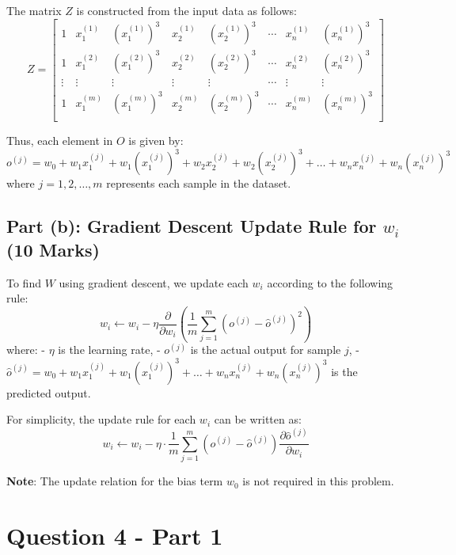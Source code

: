 \documentclass{article}
\begin{document}
	The matrix \( Z \) is constructed from the input data as follows:
	\[
	Z = \begin{bmatrix}
		1 & x_{1}^{(1)} & \left( x_{1}^{(1)} \right)^3 & x_{2}^{(1)} & \left( x_{2}^{(1)} \right)^3 & \cdots & x_{n}^{(1)} & \left( x_{n}^{(1)} \right)^3 \\
		1 & x_{1}^{(2)} & \left( x_{1}^{(2)} \right)^3 & x_{2}^{(2)} & \left( x_{2}^{(2)} \right)^3 & \cdots & x_{n}^{(2)} & \left( x_{n}^{(2)} \right)^3 \\
		\vdots & \vdots & \vdots & \vdots & \vdots & \cdots & \vdots & \vdots \\
		1 & x_{1}^{(m)} & \left( x_{1}^{(m)} \right)^3 & x_{2}^{(m)} & \left( x_{2}^{(m)} \right)^3 & \cdots & x_{n}^{(m)} & \left( x_{n}^{(m)} \right)^3 \\
	\end{bmatrix}
	\]
	
	Thus, each element in \( O \) is given by:
	\[
	o^{(j)} = w_0 + w_1 x_1^{(j)} + w_1 \left( x_1^{(j)} \right)^3 + w_2 x_2^{(j)} + w_2 \left( x_2^{(j)} \right)^3 + \dots + w_n x_n^{(j)} + w_n \left( x_n^{(j)} \right)^3
	\]
	where \( j = 1, 2, \dots, m \) represents each sample in the dataset.
	
	\subsection*{Part (b): Gradient Descent Update Rule for \( w_i \) (10 Marks)}
	
	To find \( W \) using gradient descent, we update each \( w_i \) according to the following rule:
	\[
	w_i \leftarrow w_i - \eta \frac{\partial}{\partial w_i} \left( \frac{1}{m} \sum_{j=1}^{m} \left( o^{(j)} - \hat{o}^{(j)} \right)^2 \right)
	\]
	where:
	- \( \eta \) is the learning rate,
	- \( o^{(j)} \) is the actual output for sample \( j \),
	- \( \hat{o}^{(j)} = w_0 + w_1 x_1^{(j)} + w_1 \left( x_1^{(j)} \right)^3 + \dots + w_n x_n^{(j)} + w_n \left( x_n^{(j)} \right)^3 \) is the predicted output.
	
	For simplicity, the update rule for each \( w_i \) can be written as:
	\[
	w_i \leftarrow w_i - \eta \cdot \frac{1}{m} \sum_{j=1}^{m} \left( o^{(j)} - \hat{o}^{(j)} \right) \frac{\partial \hat{o}^{(j)}}{\partial w_i}
	\]
	
	\textbf{Note}: The update relation for the bias term \( w_0 \) is not required in this problem.

	\section*{Question 4 - Part 1}
	
\end{document}
